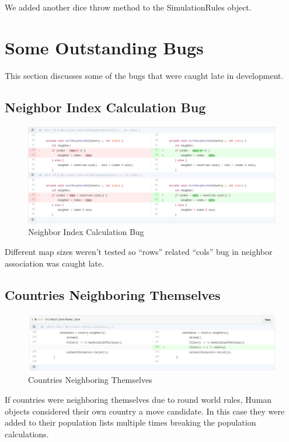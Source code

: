 \documentclass[]{article}
\begin{document}
We added another dice throw method to the SimulationRules object.

\section{Some Outstanding Bugs}\label{some-outstanding-bugs}

This section discusses some of the bugs that were caught late in
development.

\subsection{Neighbor Index Calculation
Bug}\label{neighbor-index-calculation-bug}

\begin{figure}[H]
\centering
\includegraphics{./doc/index.png}
\caption{Neighbor Index Calculation Bug}
\end{figure}

Different map sizes weren't tested so ``rows'' related ``cols'' bug in
neighbor association was caught late.

\subsection{Countries Neighboring
Themselves}\label{countries-neighboring-themselves}

\begin{figure}[H]
\centering
\includegraphics{doc/move.png}
\caption{Countries Neighboring Themselves}
\end{figure}

If countries were neighboring themselves due to round world rules, Human
objects considered their own country a move candidate. In this case they
were added to their population lists multiple times breaking the
population calculations.
\end{document}
